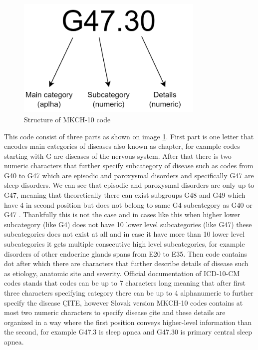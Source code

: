 \begin{figure}[!h]
	\centering
	
	\includegraphics[width=0.8\textwidth]{images/ICD-10-CM.png}
	
	\caption{Structure of MKCH-10 code}
	\label{fig:icd-10-cm}
\end{figure}

This code consist of three parts as shown on image \ref{fig:icd-10-cm}. First part is one letter that encodes main categories of diseases also known as chapter, for example codes starting with G are diseases of the nervous system. 
After that there is two numeric characters that further specify subcategory of disease such as codes from G40 to G47 which are episodic and paroxysmal disorders and specifically G47 are sleep disorders. 
We can see that episodic and paroxysmal disorders are only up to G47, meaning that theoretically there can exist subgroups G48 and G49 which have 4 in second position but does not belong to same G4 subcategory as G40 or G47 \label{mkch_subdiv}. Thankfully this is not the case and in cases like this when higher lower subcategory (like G4) does not have 10 lower level subcategories (like G47) these subcategories does not exist at all and in case it have more than 10 lower level subcategories it gets multiple consecutive high level subcategories, for example disorders of other endocrine glands spans from E20 to E35. 
Then code contains dot after which there are characters that further describe details of disease such as etiology, anatomic site and severity. Official documentation of ICD-10-CM codes stands that codes can be up to 7 characters long meaning that after first three characters specifying category there can be up to 4 alphanumeric to further specify the disease \b{CITE}, however Slovak version MKCH-10 codes contains at most two numeric characters to specify disease \b{cite} and these details are organized in a way where the first position conveys higher-level information than the second, for example G47.3 is sleep apnea and G47.30 is primary central sleep apnea.
\\

